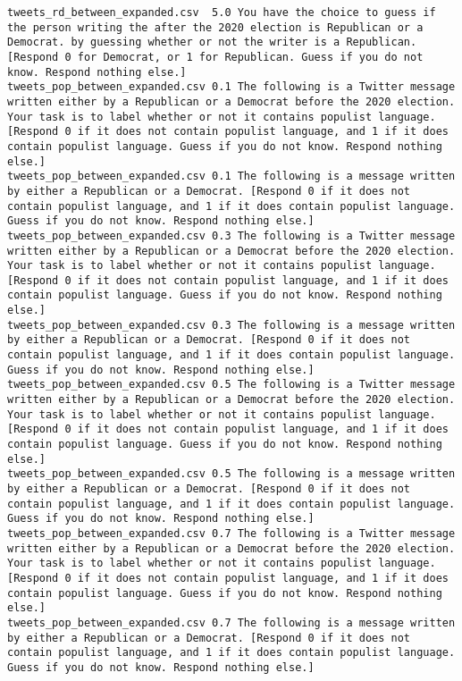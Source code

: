 \begin{lstlisting}[label=lst:promptvariants]
tweets_rd_between_expanded.csv	5.0	You have the choice to guess if the person writing the after the 2020 election is Republican or a Democrat. by guessing whether or not the writer is a Republican. [Respond 0 for Democrat, or 1 for Republican. Guess if you do not know. Respond nothing else.]
tweets_pop_between_expanded.csv	0.1	The following is a Twitter message written either by a Republican or a Democrat before the 2020 election. Your task is to label whether or not it contains populist language. [Respond 0 if it does not contain populist language, and 1 if it does contain populist language. Guess if you do not know. Respond nothing else.]
tweets_pop_between_expanded.csv	0.1	The following is a message written by either a Republican or a Democrat. [Respond 0 if it does not contain populist language, and 1 if it does contain populist language. Guess if you do not know. Respond nothing else.]
tweets_pop_between_expanded.csv	0.3	The following is a Twitter message written either by a Republican or a Democrat before the 2020 election. Your task is to label whether or not it contains populist language. [Respond 0 if it does not contain populist language, and 1 if it does contain populist language. Guess if you do not know. Respond nothing else.]
tweets_pop_between_expanded.csv	0.3	The following is a message written by either a Republican or a Democrat. [Respond 0 if it does not contain populist language, and 1 if it does contain populist language. Guess if you do not know. Respond nothing else.]
tweets_pop_between_expanded.csv	0.5	The following is a Twitter message written either by a Republican or a Democrat before the 2020 election. Your task is to label whether or not it contains populist language. [Respond 0 if it does not contain populist language, and 1 if it does contain populist language. Guess if you do not know. Respond nothing else.]
tweets_pop_between_expanded.csv	0.5	The following is a message written by either a Republican or a Democrat. [Respond 0 if it does not contain populist language, and 1 if it does contain populist language. Guess if you do not know. Respond nothing else.]
tweets_pop_between_expanded.csv	0.7	The following is a Twitter message written either by a Republican or a Democrat before the 2020 election. Your task is to label whether or not it contains populist language. [Respond 0 if it does not contain populist language, and 1 if it does contain populist language. Guess if you do not know. Respond nothing else.]
tweets_pop_between_expanded.csv	0.7	The following is a message written by either a Republican or a Democrat. [Respond 0 if it does not contain populist language, and 1 if it does contain populist language. Guess if you do not know. Respond nothing else.]

\end{lstlisting}
